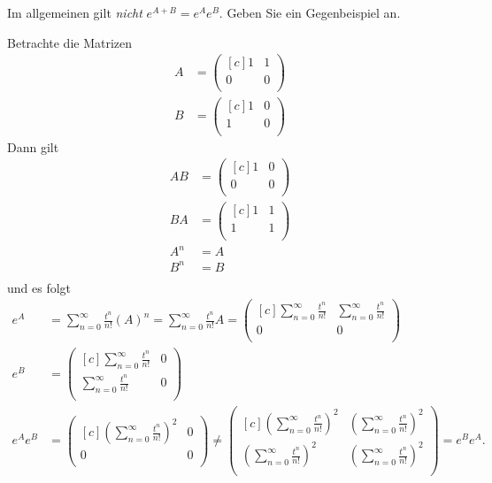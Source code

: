 \begin{exercise}
Im allgemeinen gilt \textit{nicht} $e^{A + B} = e^Ae^B$. Geben Sie ein
Gegenbeispiel an.
\end{exercise}
\begin{solution}
Betrachte die Matrizen
\begin{align*}
  A &= \begin{pmatrix*}[c]
    1 & 1 \\
    0 & 0 \\
  \end{pmatrix*} \\
  B &=  \begin{pmatrix*}[c]
    1 & 0 \\
    1 & 0 \\
  \end{pmatrix*}
\end{align*}
Dann gilt
\begin{align*}
  AB &= \begin{pmatrix*}[c]
    1 & 0 \\
    0 & 0 \\
  \end{pmatrix*}\\
  BA &= \begin{pmatrix*}[c]
    1 & 1 \\
    1 & 1 \\
  \end{pmatrix*} \\
  A^n &= A \\
  B^n &= B \\
\end{align*}
und es folgt
\begin{align*}
  e^A &= \sum_{n=0}^{\infty}\frac{t^n}{n!}(A)^n = \sum_{n=0}^{\infty}\frac{t^n}{n!}A
  = \begin{pmatrix*}[c]
    \sum_{n=0}^{\infty}\frac{t^n}{n!} & \sum_{n=0}^{\infty}\frac{t^n}{n!} \\
    0 & 0 \\
  \end{pmatrix*} \\
  e^B &= \begin{pmatrix*}[c]
    \sum_{n=0}^{\infty}\frac{t^n}{n!} & 0 \\
    \sum_{n=0}^{\infty}\frac{t^n}{n!} & 0 \\
  \end{pmatrix*} \\
  e^Ae^B &= \begin{pmatrix*}[c]
    \left(\sum_{n=0}^{\infty}\frac{t^n}{n!}\right)^2 & 0 \\
    0 & 0 \\
  \end{pmatrix*} \neq
  \begin{pmatrix*}[c]
    \left(\sum_{n=0}^{\infty}\frac{t^n}{n!}\right)^2 &
    \left(\sum_{n=0}^{\infty}\frac{t^n}{n!}\right)^2 \\
    \left(\sum_{n=0}^{\infty}\frac{t^n}{n!}\right)^2 &
    \left(\sum_{n=0}^{\infty}\frac{t^n}{n!}\right)^2 \\
  \end{pmatrix*}
  = e^Be^A.
\end{align*}
\end{solution}
